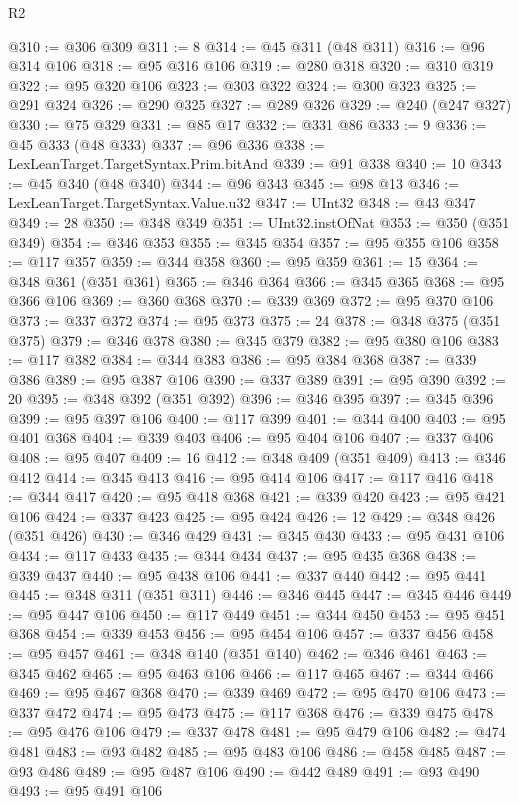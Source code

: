 \begin{lexlean}{R2}
\begin{coremodule}
@310 := @306 @309
@311 := 8
@314 := @45 @311 (@48 @311)
@316 := @96 @314 @106
@318 := @95 @316 @106
@319 := @280 @318
@320 := @310 @319
@322 := @95 @320 @106
@323 := @303 @322
@324 := @300 @323
@325 := @291 @324
@326 := @290 @325
@327 := @289 @326
@329 := @240 (@247 @327)
@330 := @75 @329
@331 := @85 @17
@332 := @331 @86
@333 := 9
@336 := @45 @333 (@48 @333)
@337 := @96 @336
@338 := LexLeanTarget.TargetSyntax.Prim.bitAnd
@339 := @91 @338
@340 := 10
@343 := @45 @340 (@48 @340)
@344 := @96 @343
@345 := @98 @13
@346 := LexLeanTarget.TargetSyntax.Value.u32
@347 := UInt32
@348 := @43 @347
@349 := 28
@350 := @348 @349
@351 := UInt32.instOfNat
@353 := @350 (@351 @349)
@354 := @346 @353
@355 := @345 @354
@357 := @95 @355 @106
@358 := @117 @357
@359 := @344 @358
@360 := @95 @359
@361 := 15
@364 := @348 @361 (@351 @361)
@365 := @346 @364
@366 := @345 @365
@368 := @95 @366 @106
@369 := @360 @368
@370 := @339 @369
@372 := @95 @370 @106
@373 := @337 @372
@374 := @95 @373
@375 := 24
@378 := @348 @375 (@351 @375)
@379 := @346 @378
@380 := @345 @379
@382 := @95 @380 @106
@383 := @117 @382
@384 := @344 @383
@386 := @95 @384 @368
@387 := @339 @386
@389 := @95 @387 @106
@390 := @337 @389
@391 := @95 @390
@392 := 20
@395 := @348 @392 (@351 @392)
@396 := @346 @395
@397 := @345 @396
@399 := @95 @397 @106
@400 := @117 @399
@401 := @344 @400
@403 := @95 @401 @368
@404 := @339 @403
@406 := @95 @404 @106
@407 := @337 @406
@408 := @95 @407
@409 := 16
@412 := @348 @409 (@351 @409)
@413 := @346 @412
@414 := @345 @413
@416 := @95 @414 @106
@417 := @117 @416
@418 := @344 @417
@420 := @95 @418 @368
@421 := @339 @420
@423 := @95 @421 @106
@424 := @337 @423
@425 := @95 @424
@426 := 12
@429 := @348 @426 (@351 @426)
@430 := @346 @429
@431 := @345 @430
@433 := @95 @431 @106
@434 := @117 @433
@435 := @344 @434
@437 := @95 @435 @368
@438 := @339 @437
@440 := @95 @438 @106
@441 := @337 @440
@442 := @95 @441
@445 := @348 @311 (@351 @311)
@446 := @346 @445
@447 := @345 @446
@449 := @95 @447 @106
@450 := @117 @449
@451 := @344 @450
@453 := @95 @451 @368
@454 := @339 @453
@456 := @95 @454 @106
@457 := @337 @456
@458 := @95 @457
@461 := @348 @140 (@351 @140)
@462 := @346 @461
@463 := @345 @462
@465 := @95 @463 @106
@466 := @117 @465
@467 := @344 @466
@469 := @95 @467 @368
@470 := @339 @469
@472 := @95 @470 @106
@473 := @337 @472
@474 := @95 @473
@475 := @117 @368
@476 := @339 @475
@478 := @95 @476 @106
@479 := @337 @478
@481 := @95 @479 @106
@482 := @474 @481
@483 := @93 @482
@485 := @95 @483 @106
@486 := @458 @485
@487 := @93 @486
@489 := @95 @487 @106
@490 := @442 @489
@491 := @93 @490
@493 := @95 @491 @106

\end{coremodule}
\end{lexlean}
